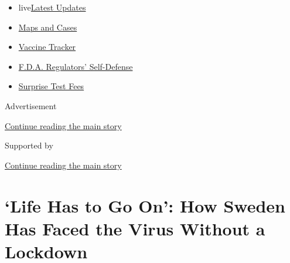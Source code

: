 \begin{itemize}
\tightlist
\item
  live\href{https://www.nytimes3xbfgragh.onion/2020/09/11/world/covid-19-coronavirus.html?name=styln-coronavirus-national\&region=TOP_BANNER\&block=storyline_menu_recirc\&action=click\&pgtype=Article\&impression_id=41cccb20-f4c0-11ea-b745-fdde6a7fe5f7\&variant=undefined}{Latest
  Updates}
\item
  \href{https://www.nytimes3xbfgragh.onion/interactive/2020/us/coronavirus-us-cases.html?name=styln-coronavirus-national\&region=TOP_BANNER\&block=storyline_menu_recirc\&action=click\&pgtype=Article\&impression_id=41ccf230-f4c0-11ea-b745-fdde6a7fe5f7\&variant=undefined}{Maps
  and Cases}
\item
  \href{https://www.nytimes3xbfgragh.onion/interactive/2020/science/coronavirus-vaccine-tracker.html?name=styln-coronavirus-national\&region=TOP_BANNER\&block=storyline_menu_recirc\&action=click\&pgtype=Article\&impression_id=41ccf231-f4c0-11ea-b745-fdde6a7fe5f7\&variant=undefined}{Vaccine
  Tracker}
\item
  \href{https://www.nytimes3xbfgragh.onion/2020/09/10/us/politics/fda-coronavirus-vaccine.html?name=styln-coronavirus-national\&region=TOP_BANNER\&block=storyline_menu_recirc\&action=click\&pgtype=Article\&impression_id=41ccf232-f4c0-11ea-b745-fdde6a7fe5f7\&variant=undefined}{F.D.A.
  Regulators' Self-Defense}
\item
  \href{https://www.nytimes3xbfgragh.onion/2020/09/09/upshot/coronavirus-surprise-test-fees.html?name=styln-coronavirus-national\&region=TOP_BANNER\&block=storyline_menu_recirc\&action=click\&pgtype=Article\&impression_id=41ccf233-f4c0-11ea-b745-fdde6a7fe5f7\&variant=undefined}{Surprise
  Test Fees}
\end{itemize}

Advertisement

\protect\hyperlink{after-top}{Continue reading the main story}

Supported by

\protect\hyperlink{after-sponsor}{Continue reading the main story}

\hypertarget{life-has-to-go-on-how-sweden-has-faced-the-virus-without-a-lockdown}{%
\section{`Life Has to Go On': How Sweden Has Faced the Virus Without a
Lockdown}\label{life-has-to-go-on-how-sweden-has-faced-the-virus-without-a-lockdown}}

